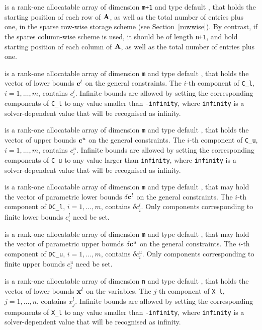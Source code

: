 \documentclass{galahad}
\begin{document}
\begin{description}
\begin{description}
 is a rank-one allocatable array of dimension {\tt m+1} and type
default \integer, that holds the
starting position of each row of ${\mathbf{A}}$, as well
as the total number of entries plus one, in the sparse row-wise storage
scheme (see Section~\ref{rowwise}). By contrast, if the spares column-wise
scheme is used, it should be of length {\tt n+1}, and hold
starting position of each column of ${\mathbf{A}}$, as well
as the total number of entries plus one.
\end{description}

 is a rank-one allocatable array of dimension {\tt m} and type
default \realdp, that holds the vector of lower bounds ${\mathbf{c}}^{l}$
on the general constraints. The $i$-th component of
{\tt C\_l}, $i = 1, \ldots , m$, contains $c_{i}^{l}$.
Infinite bounds are allowed by setting the corresponding
components of {\tt C\_l} to any value smaller than {\tt -infinity},
where {\tt infinity} is a  solver-dependent value that will be recognised as
infinity.

 is a rank-one allocatable array of dimension {\tt m} and type
default \realdp, that holds the vector of upper bounds ${\mathbf{c}}^{u}$
on the general constraints. The $i$-th component of
{\tt C\_u}, $i = 1,  \ldots ,  m$, contains $c_{i}^{u}$.
Infinite bounds are allowed by setting the corresponding
components of {\tt C\_u} to any value larger than {\tt infinity},
where {\tt infinity} is a  solver-dependent value that will be recognised as
infinity.

 is a rank-one allocatable array of dimension {\tt m} and type
default \realdp, that may hold the vector of parametric lower bounds
$\delta {\mathbf{c}}^{l}$ on the general constraints. The $i$-th component of
{\tt DC\_l}, $i = 1, \ldots , m$, contains $\delta c_{i}^{l}$.
Only components corresponding to finite lower bounds $c_{i}^{l}$
need be set.

 is a rank-one allocatable array of dimension {\tt m} and type
default \realdp, that may hold the vector of parametric upper bounds
$\delta {\mathbf{c}}^{u}$  on the general constraints. The $i$-th component of
{\tt DC\_u}, $i = 1,  \ldots ,  m$, contains $\delta c_{i}^{u}$.
Only components corresponding to finite upper bounds $c_{i}^{u}$
need be set.

 is a rank-one allocatable array of dimension {\tt n} and type
default \realdp, that holds
the vector of lower bounds ${\mathbf{x}}^{l}$ on the variables.
The $j$-th component of {\tt X\_l}, $j = 1, \ldots , n$,
contains $x_{j}^{l}$.
Infinite bounds are allowed by setting the corresponding
components of {\tt X\_l} to any value smaller than {\tt -infinity},
where {\tt infinity} is a  solver-dependent value that will be recognised as
infinity.


\end{description}
\end{document}
